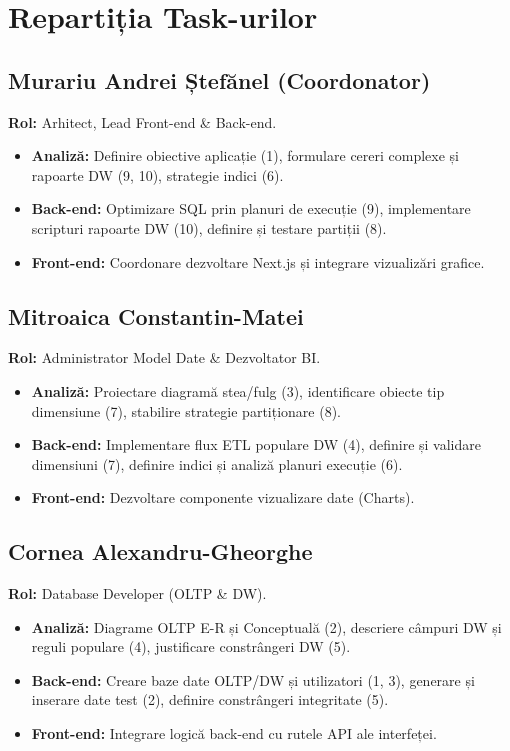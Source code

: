 \chapter{Repartiția Task-urilor}
\label{sec:repartitie_taskuri}

\section{Murariu Andrei Ștefănel (Coordonator)}
\textbf{Rol:} Arhitect, Lead Front-end \& Back-end.
\begin{itemize}
    \item \textbf{Analiză:} Definire obiective aplicație (1), formulare cereri complexe și rapoarte DW (9, 10), strategie indici (6).
    \item \textbf{Back-end:} Optimizare SQL prin planuri de execuție (9), implementare scripturi rapoarte DW (10), definire și testare partiții (8).
    \item \textbf{Front-end:} Coordonare dezvoltare Next.js și integrare vizualizări grafice.
\end{itemize}

\section{Mitroaica Constantin-Matei}
\textbf{Rol:} Administrator Model Date \& Dezvoltator BI.
\begin{itemize}
    \item \textbf{Analiză:} Proiectare diagramă stea/fulg (3), identificare obiecte tip dimensiune (7), stabilire strategie partiționare (8).
    \item \textbf{Back-end:} Implementare flux ETL populare DW (4), definire și validare dimensiuni (7), definire indici și analiză planuri execuție (6).
    \item \textbf{Front-end:} Dezvoltare componente vizualizare date (Charts).
\end{itemize}

\section{Cornea Alexandru-Gheorghe}
\textbf{Rol:} Database Developer (OLTP \& DW).
\begin{itemize}
    \item \textbf{Analiză:} Diagrame OLTP E-R și Conceptuală (2), descriere câmpuri DW și reguli populare (4), justificare constrângeri DW (5).
    \item \textbf{Back-end:} Creare baze date OLTP/DW și utilizatori (1, 3), generare și inserare date test (2), definire constrângeri integritate (5).
    \item \textbf{Front-end:} Integrare logică back-end cu rutele API ale interfeței.
\end{itemize}